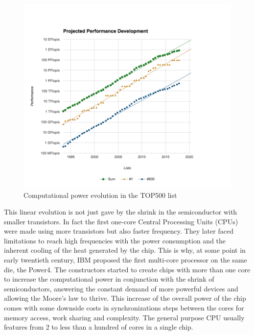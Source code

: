 \begin{figure}
\includegraphics[width=\linewidth]{figures/introduction/top500_list_approximation.png}
\caption{Computational power evolution in the TOP500 list}
\label{fig:intro_top500}
\end{figure}

This linear evolution is not just gave by the shrink in the semiconductor with smaller transistors.
In fact the first one-core Central Processing Units (CPUs) were made using more transistors but also faster frequency.
They later faced limitations to reach high frequencies with the power consumption and the inherent cooling of the heat generated by the chip.
This is why, at some point in early twentieth century, IBM proposed the first multi-core processor on the same die, the Power4.
The constructors started to create chips with more than one core to increase the computational power in conjunction with the shrink of semiconductors, answering the constant demand of more powerful devices and allowing the Moore's law to thrive. 
This increase of the overall power of the chip comes with some downside costs in synchronizations steps between the cores for memory access, work sharing and complexity.
The general purpose CPU usually features from 2 to less than a hundred of cores in a single chip.\\

